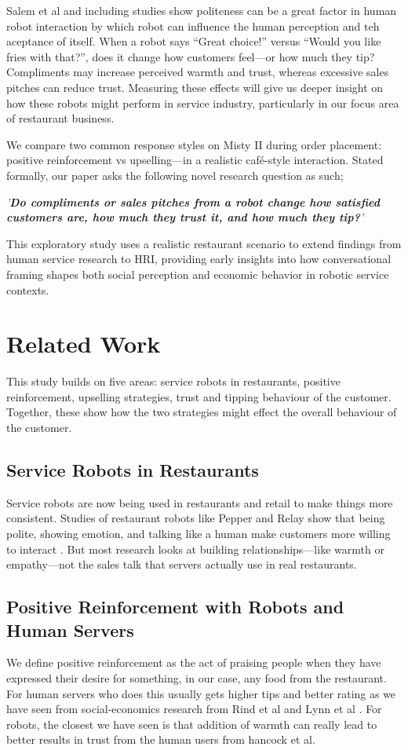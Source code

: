 \documentclass[conference]{IEEEtran}
\begin{document}
Salem et al and including studies \cite{b5} show politeness can be a great factor in human robot interaction by which robot can influence the human perception and teh aceptance of itself. When a robot says ``Great choice!'' versus ``Would you like fries with that?'', does it change how customers feel—or how much they tip? Compliments may increase perceived warmth and trust, whereas excessive sales pitches can reduce trust. Measuring these effects will give us deeper insight on how these robots might perform in service industry, particularly in our focus area of restaurant business.

We compare two common response styles on Misty II during order placement: positive reinforcement vs upselling—in a realistic café-style interaction. Stated formally, our paper asks the following novel research question as such;

\textit{'\textbf{Do compliments or sales pitches from a robot change how satisfied customers are, how much they trust it, and how much they tip?}'}

This exploratory study uses a realistic restaurant scenario to extend findings from human service research to HRI, providing early insights into how conversational framing shapes both social perception and economic behavior in robotic service contexts.
\section{Related Work}
\label{sec:related_work}
This study builds on five areas: service robots in restaurants, positive reinforcement, upselling strategies, trust and tipping behaviour of the customer. Together, these show how the two strategies might effect the overall behaviour of the customer.

\subsection{Service Robots in Restaurants}
Service robots are now being used in restaurants and retail to make things more consistent. Studies of restaurant robots like Pepper and Relay show that being polite, showing emotion, and talking like a human make customers more willing to interact \cite{b5}. But most research looks at building relationships—like warmth or empathy—not the sales talk that servers actually use in real restaurants.

\subsection{Positive Reinforcement with Robots and Human Servers}
We define positive reinforcement as the act of praising people when they have expressed their desire for something, in our case, any food from the restaurant. For human servers who does this usually gets higher tips and better rating as we have seen from social-economics research from Rind et al and Lynn et al \cite{b3, b7}. For robots, the closest we have seen is that addition of warmth can really lead to better results in trust from the human users from hancock et al.
\end{document}
